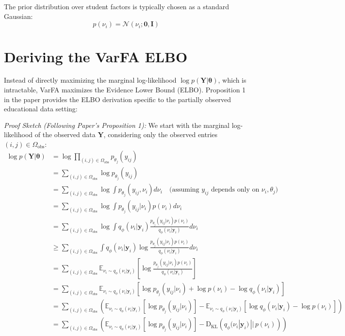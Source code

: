 \documentclass[11pt, letterpaper]{article}
\newcommand{\vy}{\boldsymbol{y}} %
\newcommand{\vtheta}{\boldsymbol{\theta}} %
\newcommand{\mY}{\boldsymbol{Y}} %
\newcommand{\mI}{\boldsymbol{I}} %
\newcommand{\E}{\mathbb{E}} %
\newcommand{\KL}[2]{\text{D}_{\text{KL}}\left(#1 \,||\, #2\right)} %
\newcommand{\Ndist}{\mathcal{N}} %
\newcommand{\yij}{y_{ij}} %
\newcommand{\nuij}{\nu_{i}} %
\newcommand{\thetaj}{\theta_{j}} %
\newcommand{\Omegaobs}{\Omega_{\text{obs}}} %
\begin{document}
The prior distribution over student factors is typically chosen as a standard Gaussian:
\begin{equation}
    p(\nuij) = \Ndist(\nuij; \mathbf{0}, \mI)
    \label{eq:prior}
\end{equation}

\section{Deriving the VarFA ELBO}

Instead of directly maximizing the marginal log-likelihood $\log p(\mY | \vtheta)$, which is intractable, VarFA maximizes the Evidence Lower Bound (ELBO). Proposition 1 in the paper provides the ELBO derivation specific to the partially observed educational data setting:

\emph{Proof Sketch (Following Paper's Proposition 1):}
We start with the marginal log-likelihood of the observed data $\mY$, considering only the observed entries $(i,j) \in \Omegaobs$:
\begin{align}
    \log p(\mY | \vtheta) &= \log \prod_{(i,j) \in \Omegaobs} p_{\thetaj}(\yij) \\
    &= \sum_{(i,j) \in \Omegaobs} \log p_{\thetaj}(\yij) \\
    &= \sum_{(i,j) \in \Omegaobs} \log \int p_{\thetaj}(\yij, \nuij) d\nuij \quad \text{(assuming } \yij \text{ depends only on } \nuij, \thetaj \text{)} \\
    &= \sum_{(i,j) \in \Omegaobs} \log \int p_{\thetaj}(\yij | \nuij) p(\nuij) d\nuij \\
    &= \sum_{(i,j) \in \Omegaobs} \log \int q_{\phi}(\nuij | \vy_i) \frac{p_{\thetaj}(\yij | \nuij) p(\nuij)}{q_{\phi}(\nuij | \vy_i)} d\nuij \\
    &\ge \sum_{(i,j) \in \Omegaobs} \int q_{\phi}(\nuij | \vy_i) \log \frac{p_{\thetaj}(\yij | \nuij) p(\nuij)}{q_{\phi}(\nuij | \vy_i)} d\nuij \\
    &= \sum_{(i,j) \in \Omegaobs} \E_{\nuij \sim q_{\phi}(\nuij | \vy_i)} \left[ \log \frac{p_{\thetaj}(\yij | \nuij) p(\nuij)}{q_{\phi}(\nuij | \vy_i)} \right] \\
    &= \sum_{(i,j) \in \Omegaobs} \E_{\nuij \sim q_{\phi}(\nuij | \vy_i)} \left[ \log p_{\thetaj}(\yij | \nuij) + \log p(\nuij) - \log q_{\phi}(\nuij | \vy_i) \right] \\
    &= \sum_{(i,j) \in \Omegaobs} \left( \E_{\nuij \sim q_{\phi}(\nuij | \vy_i)} [\log p_{\thetaj}(\yij | \nuij)] - \E_{\nuij \sim q_{\phi}(\nuij | \vy_i)} [\log q_{\phi}(\nuij | \vy_i) - \log p(\nuij)] \right) \\
    &= \sum_{(i,j) \in \Omegaobs} \left( \E_{\nuij \sim q_{\phi}(\nuij | \vy_i)} [\log p_{\thetaj}(\yij | \nuij)] - \KL{q_{\phi}(\nuij | \vy_i)}{p(\nuij)} \right)
\end{align}
\end{document}
